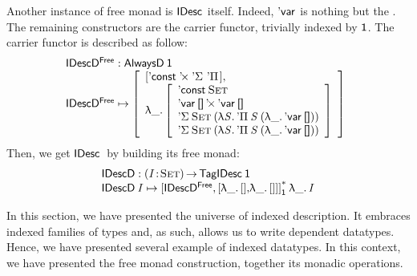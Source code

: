 Another instance of free monad is $\IDesc{\!}$ itself. Indeed,
$\DVar{\!}$ is nothing but the \return. The remaining constructors are
the carrier functor, trivially indexed by $\Unit$. The carrier functor
is described as follow:
%
\[\stk{
\IDescFreeD : \ATagIDesc{\Unit} \\
\begin{array}{@{}ll}
\IDescFreeD \mapsto \bigRedBracket{\begin{array}{l}
                                \sqr{\DConst{\!}\:
                                 \DProd{\!}{\!}\:
                                 \DSigma{\!}{\!}\: 
                                 \DPi{\!}{\!}} \red{,}\\
                                  \LAM{\_}\bigRedBracket{\begin{array}{l}
                                        \DConst{\Set}               \\
                                        \DProd{\DVar{\Void}}{\DVar{\Void}}  \\
                                        \DSigma{\Set}{(\LAM{\V{S}} \DPi{\V{S}}{(\LAM{\_} \DVar{\Void})})} \\
                                        \DSigma{\Set}{(\LAM{\V{S}} \DPi{\V{S}}{(\LAM{\_} \DVar{\Void})})}
                                    \end{array}}\end{array}}
\end{array}
}\]
%
Then, we get $\IDesc$ by building its free monad:
%
\[\stk{
\IDescD : \PI{\V{I}}{\Set} \TagIDesc{\Unit} \\
\IDescD\: \V{I} \mapsto \FreeIMonad{\red{[}\IDescFreeD\red{,[}\LAM{\_}\sqr{}\red{,}\LAM{\_}\red{[]]]}}{\Unit}\LAM{\_}\V{I}
}\]


In this section, we have presented the universe of indexed
description. It embraces indexed families of types and, as such,
allows us to write dependent datatypes. Hence, we have presented
several example of indexed datatypes. In this context, we have
presented the free monad construction, together its monadic
operations.

